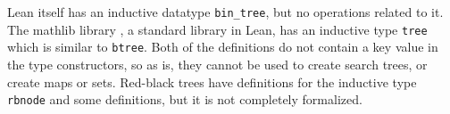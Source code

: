 Lean itself has an inductive datatype \lstinline{bin_tree}, but no operations related to it. The mathlib library \cite{The_mathlib_Community_2020}, a standard library in Lean, has an inductive type \lstinline{tree} which is similar to \lstinline{btree}. Both of the definitions do not contain a key value in the type constructors, so as is, they cannot be used to create search trees, or create maps or sets. Red-black trees have definitions for the inductive type \lstinline{rbnode} and some definitions, but it is not completely formalized. 